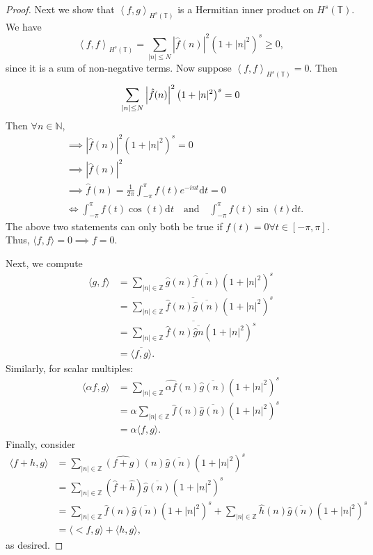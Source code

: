 \documentclass{article}
\newcommand{\N}{\mathbb{N}} %
\begin{document}
\begin{proof}
	Next we show that $\left<f,g\right>_{H^s(\mathbb{T})}$ is a Hermitian inner product on $H^s(\mathbb{T})$. We have
	\begin{equation}
		\left<f, f\right>_{H^s(\mathbb{T})} = \sum_{|n| \leq N} \left|\hat{f}(n)\right|^2 \left(1 + |n|^2\right)^s \geq 0,
	\end{equation}
	since it is a sum of non-negative terms. Now suppose $\left<f, f\right>_{H^s(\mathbb{T})} = 0$. Then
	\begin{equation}
		\sum_{|n| \leq N} \left|\hat{f}(n)\right|^2 \left(1 + |n|^2\right)^s = 0 \\
	\end{equation}
	Then $\forall n \in \N$, 
	\begin{align}
		&\implies \left|\hat{f}(n)\right|^2 \left(1 + |n|^2\right)^s = 0 \\
		&\implies \left|\hat{f}(n)\right|^2 \\
		&\implies \hat{f}(n) = \frac{1}{2\pi} \int_{-\pi}^\pi f(t) e^{-int} \mathrm{d}t = 0 \\
		&\iff \int_{-\pi}^\pi f(t) \cos(t) \mathrm{d}t \quad \mathrm{and} \quad \int_{-\pi}^\pi f(t) \sin(t) \mathrm{d}t.
	\end{align}
	The above two statements can only both be true if $f(t) = 0 \forall t \in [-\pi, \pi]$. Thus, $\langle f, f\rangle = 0 \implies f = 0$.
	
	Next, we compute
	\begin{align}
		\langle g, f \rangle &=\sum_{|n| \in \mathbb{Z}} \hat{g}(n)\overline{\hat{f}(n)} \left(1 + |n|^2\right)^s \\
		&= \sum_{|n| \in \mathbb{Z}} \overline{\hat{f}(n)\overline{\hat{g}(n)}} \left(1 + |n|^2\right)^s \\
		&= \overline{\sum_{|n| \in \mathbb{Z}} \hat{f}(n)\overline{\hat{g}{n}}\left(1 + |n|^2\right)^s} \\
		&= \overline{\langle f, g \rangle}.
	\end{align}
	Similarly, for scalar multiples:
	\begin{align}
		\langle \alpha f, g \rangle &= \sum_{|n| \in \mathbb{Z}} \widehat{\alpha f}(n) \overline{\hat{g}(n)}\left(1 + |n|^2\right)^s \\
		&= \alpha \sum_{|n| \in \mathbb{Z}} \widehat{f}(n) \overline{\hat{g}(n)}\left(1 + |n|^2\right)^s \\
		&= \alpha \langle f, g \rangle.
	\end{align}
	Finally, consider
	\begin{align}
		\langle f + h, g \rangle &= \sum_{|n| \in \mathbb{Z}} \widehat{(f + g)}(n) \overline{\hat{g}(n)} \left(1 + |n|^2\right)^s \\
		&= \sum_{|n| \in \mathbb{Z}} \left(\hat{f} + \hat{h}\right) \overline{\hat{g}(n)} \left(1 + |n|^2\right)^s \\
		&= \sum_{|n| \in \mathbb{Z}} \hat{f}(n)\overline{\hat{g}(n)}\left(1 + |n|^2\right)^s + \sum_{|n| \in \mathbb{Z}} \hat{h}(n)\overline{\hat{g}(n)}\left(1 + |n|^2\right)^s \\
		&= \langle< f, g \rangle + \langle h, g \rangle,
	\end{align}
	as desired.


\end{proof}
\end{document}
